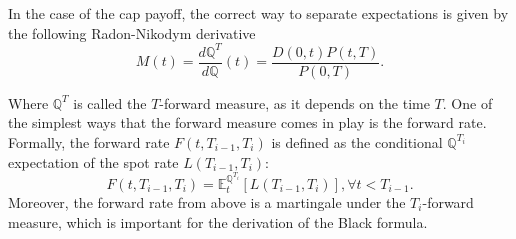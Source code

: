 \documentclass[titlepage, 12pt]{article}
\newcommand{\Q}{\mathbb{Q}}
\begin{document}
	In the case of the cap payoff, the correct way to separate expectations is given by the following Radon-Nikodym derivative
	\begin{equation}
		M(t)=\frac{d\Q^T}{d\Q}(t)=\frac{D(0,t)P(t,T)}{P(0,T)}.
	\end{equation}
	
	Where $\Q^T$ is called the $T$-forward measure, as it depends on the time $T$. One of the simplest ways that the forward measure comes in play is the forward rate. Formally, the forward rate $F(t,T_{i-1},T_i)$ is defined as the conditional $\Q^{T_i}$ expectation of the spot rate $L(T_{i-1},T_i)$:
	\begin{equation}
		F(t,T_{i-1},T_i) = \mathbb{E}^{\mathbb{Q}^{T_i}}_t\left[L(T_{i-1},T_i)\right], \forall t< T_{i-1}.
	\end{equation}
	Moreover, the forward rate from above is a martingale under the $T_i$-forward measure, which is important for the derivation of the Black formula.
	
\end{document}
